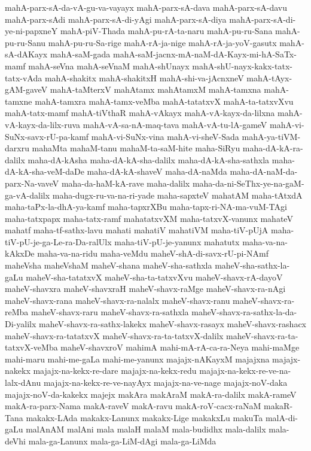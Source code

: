 {mahA-parx-sA-da-vA-gu-va-vayayx
mahA-parx-sA-dava
mahA-parx-sA-davu
mahA-parx-sAdi
mahA-parx-sA-di-yAgi
mahA-parx-sA-diya
mahA-parx-sA-di-ye-ni-papxneY
mahA-piV-Thada
mahA-pu-rA-ta-naru
mahA-pu-ru-Sana
mahA-pu-ru-Sanu
mahA-pu-ru-Sa-rige
mahA-rA-ja-nige
mahA-rA-ja-yoV-gasutx
mahA-sA-dAKayx
mahA-saM-gada
mahA-saM-jacnx-mA-naM-dA-Kayx-mi-hA-SaTx-mamf
mahA-seVna
mahA-seVnaM
mahA-shUnayx
mahA-shU-nayx-kakx-tatx-tatx-vAda
mahA-shakitx
mahA-shakitxH
mahA-shi-va-jAcnxneV
mahA-tAyx-gAM-gaveV
mahA-taMterxV
mahAtamx
mahAtamxM
mahA-tamxna
mahA-tamxne
mahA-tamxra
mahA-tamx-veMba
mahA-tatatxvX
mahA-ta-tatxvXvu
mahA-tatx-mamf
mahA-tiVthaR
mahA-vAkayx
mahA-vA-kayx-da-lilxna
mahA-vA-kayx-da-lilx-ruva
mahA-vA-sa-nA-maq-tava
mahA-vA-tu-lA-gameV
mahA-vi-SuNx-savx-rU-pa-kamf
mahA-vi-SuNx-vina
mahA-vi-sheV-Sada
mahA-ya-tiVM-darxru
mahaMta
mahaM-tanu
mahaM-ta-saM-hite
maha-SiRyu
maha-dA-kA-ra-dalilx
maha-dA-kAsha
maha-dA-kA-sha-dalilx
maha-dA-kA-sha-sathxla
maha-dA-kA-sha-veM-daDe
maha-dA-kA-shaveV
maha-dA-naMda
maha-dA-naM-da-parx-Na-vaveV
maha-da-haM-kA-rave
maha-dalilx
maha-da-ni-SeThx-ye-na-gaM-ga-vA-dalilx
maha-dugx-ru-va-na-ri-yade
maha-sapxteV
mahatAM
maha-tAtxdA
maha-taPx-la-dhA-ya-kamf
maha-tapxrXBu
maha-tapx-ri-NA-ma-vuM-TAgi
maha-tatxpapx
maha-tatx-ramf
mahatatxvXM
maha-tatxvX-vanunx
mahateV
mahatf
maha-tf-sathx-lavu
mahati
mahatiV
mahatiVM
maha-tiV-pUjA
maha-tiV-pU-je-ga-Le-ra-Da-ralUlx
maha-tiV-pU-je-yanunx
mahatutx
maha-va-na-kAkxDe
maha-va-na-ridu
maha-veMdu
maheV-shA-di-savx-rU-pi-NAmf
maheVsha
maheVshaM
maheV-shana
maheV-sha-sathxla
maheV-sha-sathx-la-gaLu
maheV-sha-tatatxvX
maheV-sha-ta-tatxvXvu
maheV-shavx-rA-dayoV
maheV-shavxra
maheV-shavxraH
maheV-shavx-raMge
maheV-shavx-ra-nAgi
maheV-shavx-rana
maheV-shavx-ra-nalalx
maheV-shavx-ranu
maheV-shavx-ra-reMba
maheV-shavx-raru
maheV-shavx-ra-sathxla
maheV-shavx-ra-sathx-la-da-Di-yalilx
maheV-shavx-ra-sathx-lakekx
maheV-shavx-rasayx
maheV-shavx-rashacx
maheV-shavx-ra-tatatxvX
maheV-shavx-ra-ta-tatxvX-dalilx
maheV-shavx-ra-ta-tatxvX-veMba
maheV-shavxroV
mahimA
mahi-mA-rA-ca-ra-Neya
mahi-maMge
mahi-maru
mahi-me-gaLa
mahi-me-yanunx
majajx-nAKayxM
majajxna
majajx-nakekx
majajx-na-kekx-re-dare
majajx-na-kekx-redu
majajx-na-kekx-re-ve-na-lalx-dAnu
majajx-na-kekx-re-ve-nayAyx
majajx-na-ve-nage
majajx-noV-daka
majajx-noV-da-kakekx
majejx
makAra
makAraM
makA-ra-dalilx
makA-rameV
makA-ra-parx-Nama
makA-raveV
makA-ravu
makA-roV-cacx-raNaM
makaR-Tana
makakx-LAda
makakx-Lanunx
makakx-Lige
makakxLu
makuTa
malA-di-gaLu
malAnAM
malAni
mala
malaH
malaM
mala-budidhx
mala-dalilx
mala-deVhi
mala-ga-Lanunx
mala-ga-LiM-dAgi
mala-ga-LiMda
}
